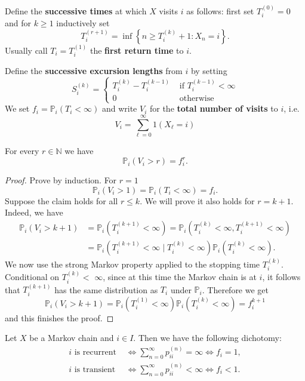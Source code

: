 \documentclass[a4paper]{article}
\begin{document}
\begin{definition}
    Define the \textbf{successive times} at which $X$ visits $i$ as follows: first set $T_i^{(0)}=0$
    and for $k \geq 1$ inductively set
    \[
    T_i^{(r+1)}=\inf \left\{n \geq T_i^{(k)}+1: X_n=i\right\} .
    \]
    Usually call $T_i=T_i^{(1)}$ the \textbf{first return time} to $i$. 
    
    Define the \textbf{successive excursion lengths} from $i$ by setting
    \[
    S_i^{(k)}=\begin{cases}
        T_i^{(k)}-T_i^{(k-1)} & \text { if } T_i^{(k-1)}<\infty \\
        0 & \text { otherwise }
    \end{cases} 
    \]
    We set $f_i=\mathbb{P}_i\left(T_i<\infty\right)$ and write $V_i$ for the \textbf{total number of visits} to $i$, i.e.
    \[
    V_i=\sum_{\ell=0}^{\infty} 1\left(X_{\ell}=i\right)
    \]
\end{definition}

\begin{lemma}
    For every $r \in \mathbb{N}$ we have
    \[
    \mathbb{P}_i\left(V_i>r\right)=f_i^r .
    \]
\end{lemma}

\begin{proof}
    Prove by induction. For $r=1$
    \[
    \mathbb{P}_i\left(V_i>1\right)=\mathbb{P}_i\left(T_i<\infty\right)=f_i .
    \]
    Suppose the claim holds for all $r \leq k$. We will prove it also holds for $r=k+1$. Indeed, we have
    \[
    \begin{aligned}
    \mathbb{P}_i\left(V_i>k+1\right) &=\mathbb{P}_i\left(T_i^{(k+1)}<\infty\right)=\mathbb{P}_i\left(T_i^{(k)}<\infty, T_i^{(k+1)}<\infty\right) \\
    &=\mathbb{P}_i\left(T_i^{(k+1)}<\infty \mid T_i^{(k)}<\infty\right) \mathbb{P}_i\left(T_i^{(k)}<\infty\right) .
    \end{aligned}
    \]
    We now use the strong Markov property applied to the stopping time $T_i^{(k)}$. Conditional on $T_i^{(k)}<$ $\infty$, since at this time the Markov chain is at $i$, it follows that $T_i^{(k+1)}$ has the same distribution as $T_i$ under $\mathbb{P}_i$. Therefore we get
    \[
    \mathbb{P}_i\left(V_i>k+1\right)=\mathbb{P}_i\left(T_i^{(1)}<\infty\right) \mathbb{P}_i\left(T_i^{(k)}<\infty\right)=f_i^{k+1}
    \]
    and this finishes the proof.
\end{proof}

\begin{theorem}
    Let $X$ be a Markov chain and $i \in I$. Then we have the following dichotomy:
\[
    \begin{aligned}
        i \text { is recurrent } & \Longleftrightarrow \sum_{n=0}^{\infty} p_{i i}^{(n)}=\infty \Longleftrightarrow f_i=1, \\
        i \text { is transient } & \Longleftrightarrow \sum_{n=0}^{\infty} p_{i i}^{(n)}<\infty \Longleftrightarrow f_i<1 .
    \end{aligned}
\]
\end{theorem}
\end{document}
